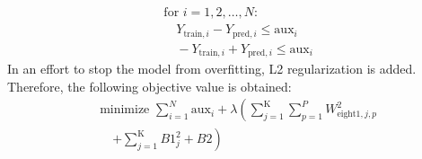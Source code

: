 \begin{align*}
    &\text{for } i = 1, 2, \ldots, N: \\
    &\quad Y_{\text{train}, i} - Y_{\text{pred}, i} \leq \text{aux}_i \\
    &\quad -Y_{\text{train}, i} + Y_{\text{pred}, i} \leq \text{aux}_i
\end{align*}
In an effort to stop the model from overfitting, L2 regularization is added. Therefore, the following objective value is obtained:
\begin{align*}
    &\text{minimize } \sum_{i=1}^{N} \text{aux}_i + \lambda \left( \sum_{j=1}^{\text{K}} \sum_{p=1}^{P} W_{\text{eight1}, j, p}^2 \right. \\
    &\quad \left. + \sum_{j=1}^{\text{K}} B1_j^2 + B2 \right)
\end{align*}
